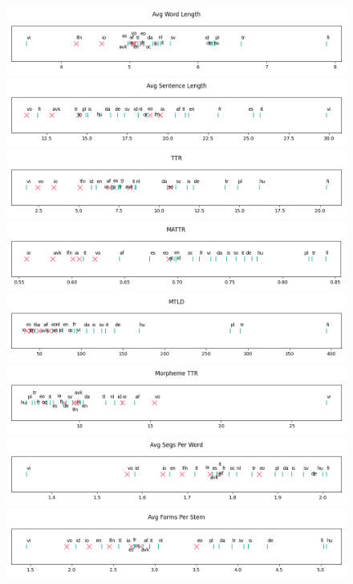 \documentclass[12pt,a4paper]{article}
\numberwithin{figure}{section}
\numberwithin{table}{section}
\numberwithin{definition}{section}
\begin{document}
\begin{figure}[!ht]
  \centering
  \includegraphics[width=\textwidth]{1d_Avg_Word_Length.png} 
  \includegraphics[width=\textwidth]{1d_Avg_Sentence_Length.png}
  \includegraphics[width=\textwidth]{1d_TTR.png}
  \includegraphics[width=\textwidth]{1d_MATTR.png}
  \includegraphics[width=\textwidth]{1d_MTLD.png}
  \includegraphics[width=\textwidth]{1d_Morpheme_TTR.png}
  \includegraphics[width=\textwidth]{1d_Avg_Segs_Per_Word.png}
  \includegraphics[width=\textwidth]{1d_Avg_Forms_Per_Stem.png} 
\end{figure}
\end{document}
